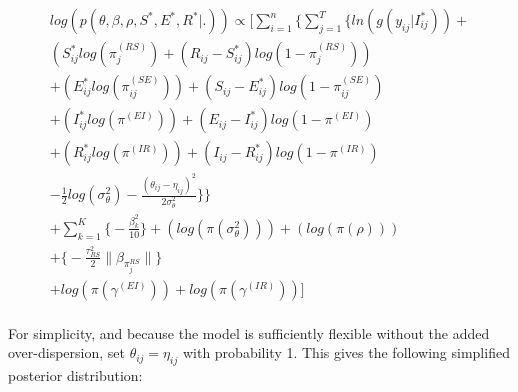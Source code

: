 \documentclass[12pt]{article}
\begin{document}
\begin{center}
\begin{multline}
\displaystyle
log(p(\theta,\beta,\rho,S^*,E^*,R^*|.)) \propto \Bigg[ 
    \sum_{i=1}^n \bigg\{ \sum_{j=1}^T
        \Big\{ ln(g(y_{ij}|I^*_{ij})) + \\ 
            (S^*_{ij}log(\pi_j^{(RS)}) + (R_{ij} - S^*_{ij})log(1-\pi_j^{(RS)})) \\
            + (E^*_{ij}log(\pi_{ij}^{(SE)})) + (S_{ij} - E^*_{ij})log(1-\pi_{ij}^{(SE)}) \\
            + (I^*_{ij}log(\pi^{(EI)})) + (E_{ij} - I^*_{ij})log(1-\pi^{(EI)}) \\
            + (R^*_{ij}log(\pi^{(IR)})) + (I_{ij} - R^*_{ij})log(1-\pi^{(IR)}) \\
    - \frac{1}{2}log(\sigma^2_{\theta}) - \frac{(\theta_{ij}-\eta_{ij})^2}{2\sigma^2_{\theta}}\Big\}\bigg\} \\
    + \sum_{k = 1}^K\bigg\{-\frac{\beta^2_k}{10}\bigg\}
            + (log(\pi(\sigma^2_{\theta})))
            + (log(\pi(\rho)))\\
            + \bigg\{ -\frac{\tau^2_{RS}}{2}\|\beta_{\pi_j^{RS}}\|  \bigg\} \\ 
        + log(\pi(\gamma^{(EI)})) + log(\pi(\gamma^{(IR)}))\Bigg]\\
\end{multline}
\end{center}

For simplicity, and because the model is sufficiently flexible without the added over-dispersion, set $\theta_{ij} = \eta_{ij}$ with probability 1. This 
gives the following simplified posterior distribution:
\end{document}
